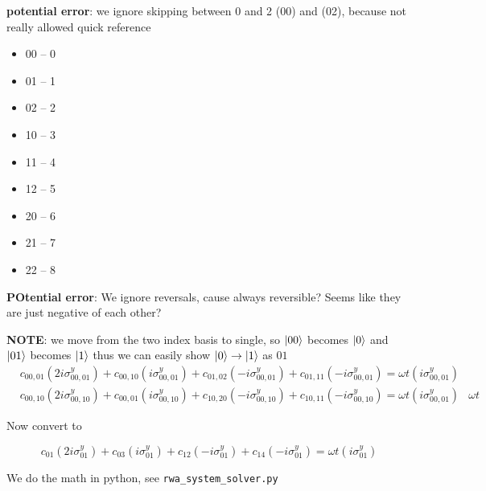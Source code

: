 \documentclass[12pt]{article}
\begin{document}
\textbf{potential error}: we ignore skipping between 0 and 2 (00) and (02), because not really allowed
\newpage
quick reference
\begin{itemize}
    \item 00 -- 0
    \item 01 -- 1
    \item 02 -- 2
    \item 10 -- 3
    \item 11 -- 4
    \item 12 -- 5
    \item 20 -- 6
    \item 21 -- 7
    \item 22 -- 8
\end{itemize}
\textbf{POtential error}: We ignore reversals, cause always reversible? Seems
like they are just negative of each other?

\textbf{NOTE}: we move from the two index basis to single, so $\ket{00}$ becomes
$\ket{0}$ and $\ket{01}$ becomes $\ket{1}$ thus we can easily
show $\ket{0} \rightarrow \ket{1}$ as $01$
\begin{align}
    & c_{00,01}(2 i \sigma^y_{00,01})
    + c_{00,10}(i \sigma^y_{00,01}) 
    + c_{01,02}(- i \sigma^y_{00,01}) 
    + c_{01,11}(- i \sigma^y_{00,01}) 
    = \omega t (i \sigma^y_{00,01})\\
    & c_{00,10}(2 i \sigma^y_{00,10})
    + c_{00,01}(i \sigma^y_{00,10}) 
    + c_{10,20}(- i \sigma^y_{00,10}) 
    + c_{10,11}(- i \sigma^y_{00,10}) 
    = \omega t (i \sigma^y_{00,01})
    & \omega t
\end{align}

Now convert to 

\begin{equation}
      c_{01}(2 i \sigma^y_{01})
    + c_{03}(i \sigma^y_{01})
    + c_{12}(- i \sigma^y_{01}) 
    + c_{14}(- i \sigma^y_{01})
    = \omega t (i \sigma^y_{01})
\end{equation}

We do the math in python, see \texttt{rwa\_system\_solver.py}
\end{document}
